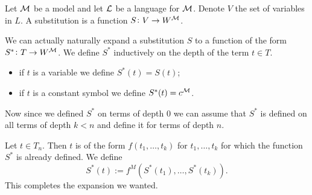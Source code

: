 \documentclass[11pt,a4paper]{article}
\begin{document}
\begin{definition}[Substitution]
  Let $\mathcal{M}$ be a model and let $\mathcal{L}$ be a language for $\mathcal{M}$.
  Denote $V$ the set of variables in $L$.
  A substitution is a function $S \colon V \to W^{\mathcal{M}}$.
\end{definition}

We can actually naturally expand a substitution $S$ to a function of
the form $S^* \colon T \to W^{\mathcal{M}}$.
We define $S^*$ inductively on the depth of the term $t \in T$.
\begin{itemize}
  \item if $t$ is a variable we define $S^*(t) = S(t)$;
  \item if $t$ is a constant symbol we define $S^*(t) = c^{\mathcal{M}}$.
\end{itemize}
Now since we defined $S^*$ on terms of depth $0$ we can assume that $S^*$
is defined on all terms of depth $k < n$ and define it for terms of depth
$n$.

Let $t \in T_n$. Then $t$ is of the form $f(t_1,\dots,t_k)$ for
$t_1,\dots,t_k$ for which the function $S^*$ is already defined.
We define
\[
  S^*(t) := f^M(S^*(t_1),\dots,S^*(t_k)).
\]
This completes the expansion we wanted.
\end{document}
